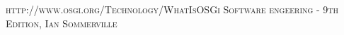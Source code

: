 \begin{thebibliography}{9}
 \textsc {http://www.osgi.org/Technology/WhatIsOSGi
}
 \textsc {Software engeering - 9th Edition, Ian Sommerville
}
\end{thebibliography}